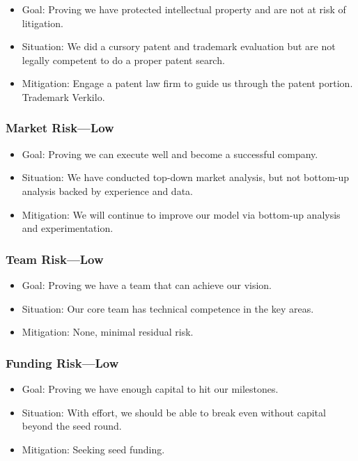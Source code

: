 \documentclass[10pt,openany]{book}
\providecommand{\tightlist}{%
  \setlength{\itemsep}{0pt}\setlength{\parskip}{0pt}}
\begin{document}
\begin{itemize}
\tightlist
\item
  Goal: Proving we have protected intellectual property and are not at
  risk of litigation.
\item
  Situation: We did a cursory patent and trademark evaluation but are
  not legally competent to do a proper patent search.
\item
  Mitigation: Engage a patent law firm to guide us through the patent
  portion. Trademark Verkilo.
\end{itemize}

\hypertarget{market-risklow}{%
\subsubsection{Market Risk---Low}\label{market-risklow}}

\begin{itemize}
\tightlist
\item
  Goal: Proving we can execute well and become a successful company.
\item
  Situation: We have conducted top-down market analysis, but not
  bottom-up analysis backed by experience and data.
\item
  Mitigation: We will continue to improve our model via bottom-up
  analysis and experimentation.
\end{itemize}

\newpage

\hypertarget{team-risklow}{%
\subsubsection{Team Risk---Low}\label{team-risklow}}

\begin{itemize}
\tightlist
\item
  Goal: Proving we have a team that can achieve our vision.
\item
  Situation: Our core team has technical competence in the key areas.
\item
  Mitigation: None, minimal residual risk.
\end{itemize}

\hypertarget{funding-risklow}{%
\subsubsection{Funding Risk---Low}\label{funding-risklow}}

\begin{itemize}
\tightlist
\item
  Goal: Proving we have enough capital to hit our milestones.
\item
  Situation: With effort, we should be able to break even without
  capital beyond the seed round.
\item
  Mitigation: Seeking seed funding.
\end{itemize}
\end{document}
